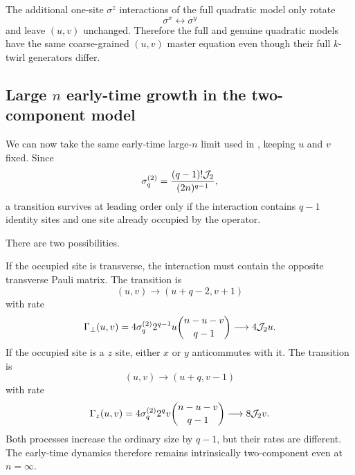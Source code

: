 \documentclass{article}
\theoremstyle{definition}
\begin{document}
The additional one-site $\sigma^z$ interactions of the full quadratic
model only rotate
\begin{equation}
    \sigma^x\leftrightarrow\sigma^y
\end{equation}
and leave $(u,v)$ unchanged.  Therefore the full and genuine quadratic
models have the same coarse-grained $(u,v)$ master equation even though
their full $k$-twirl generators differ.


\subsection{Large $n$ early-time growth in the two-component model}
\label{subsec:BDN_largeN_growth}

We can now take the same early-time large-$n$ limit used in
\cite{Xu2024}, keeping $u$ and $v$ fixed.  Since
\begin{equation}
    \sigma_q^{(2)}
    =
    \frac{(q-1)!{\cal J}_2}
         {(2n)^{q-1}},
\end{equation}
a transition survives at leading order only if the interaction contains
$q-1$ identity sites and one site already occupied by the operator.

There are two possibilities.

If the occupied site is transverse, the interaction must contain the
opposite transverse Pauli matrix.  The transition is
\begin{equation}
    (u,v)
    \longrightarrow
    (u+q-2,v+1)
\end{equation}
with rate
\begin{equation}
    \Gamma_\perp(u,v)
    =
    4\sigma_q^{(2)}
    2^{q-1}u
    \binom{n-u-v}{q-1}
    \longrightarrow
    4{\cal J}_2u.
    \label{eq:spinbrown_BDN_largeN_perp}
\end{equation}
If the occupied site is a $z$ site, either $x$ or $y$ anticommutes with it.
The transition is
\begin{equation}
    (u,v)
    \longrightarrow
    (u+q,v-1)
\end{equation}
with rate
\begin{equation}
    \Gamma_z(u,v)
    =
    4\sigma_q^{(2)}
    2^qv
    \binom{n-u-v}{q-1}
    \longrightarrow
    8{\cal J}_2v.
    \label{eq:spinbrown_BDN_largeN_z}
\end{equation}
Both processes increase the ordinary size by $q-1$, but their rates are
different.  The early-time dynamics therefore remains intrinsically
two-component even at $n=\infty$.
\end{document}

